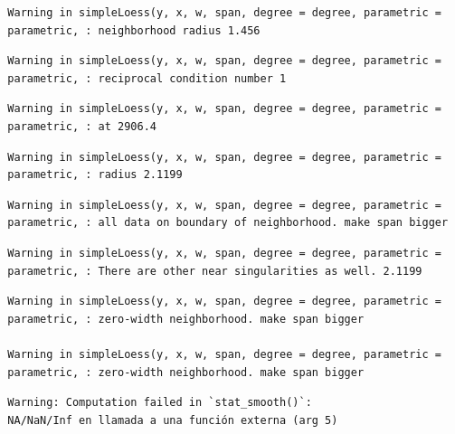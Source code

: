 \documentclass[12pt,twoside]{reedthesis}
\begin{document}
  \begin{verbatim}
  Warning in simpleLoess(y, x, w, span, degree = degree, parametric =
  parametric, : neighborhood radius 1.456
  \end{verbatim}
  
  \begin{verbatim}
  Warning in simpleLoess(y, x, w, span, degree = degree, parametric =
  parametric, : reciprocal condition number 1
  \end{verbatim}
  
  \begin{verbatim}
  Warning in simpleLoess(y, x, w, span, degree = degree, parametric =
  parametric, : at 2906.4
  \end{verbatim}
  
  \begin{verbatim}
  Warning in simpleLoess(y, x, w, span, degree = degree, parametric =
  parametric, : radius 2.1199
  \end{verbatim}
  
  \begin{verbatim}
  Warning in simpleLoess(y, x, w, span, degree = degree, parametric =
  parametric, : all data on boundary of neighborhood. make span bigger
  \end{verbatim}
  
  \begin{verbatim}
  Warning in simpleLoess(y, x, w, span, degree = degree, parametric =
  parametric, : There are other near singularities as well. 2.1199
  \end{verbatim}
  
  \begin{verbatim}
  Warning in simpleLoess(y, x, w, span, degree = degree, parametric =
  parametric, : zero-width neighborhood. make span bigger
  
  Warning in simpleLoess(y, x, w, span, degree = degree, parametric =
  parametric, : zero-width neighborhood. make span bigger
  \end{verbatim}
  
  \begin{verbatim}
  Warning: Computation failed in `stat_smooth()`:
  NA/NaN/Inf en llamada a una función externa (arg 5)
  \end{verbatim}
  
\end{document}
